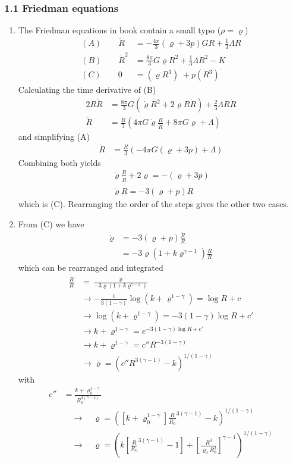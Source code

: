 \documentclass[10pt,a4paper]{book}
\theoremstyle{definition}
\begin{document}
\subsubsection{1.1 Friedman equations}
\begin{enumerate}
\item The Friedman equations in book contain a small typo ($\rho=\varrho$)
\begin{align}
    (A)\qquad \ddot R&=-\frac{4\pi}{3}(\varrho+3p)GR+\frac{1}{3}\Lambda R\\
    (B)\qquad  \dot R^2&=\frac{8\pi}{3}G\varrho R^2+\frac{1}{3}\Lambda R^2-K\\
    (C)\qquad 0&=(\varrho R^3)^\cdot+p(R^3)^\cdot
\end{align}
Calculating the time derivative of (B)
\begin{align}
    2\dot{R}\ddot{R}&=\frac{8\pi}{3}G(\dot{\varrho}R^2+2\varrho R\dot{R})+\frac{2}{3}\Lambda R\dot{R}\\
    \ddot{R}&=\frac{R}{3}\left(4\pi G\dot\varrho \frac{R}{\dot{R}}+8\pi G\varrho +\Lambda\right)
\end{align}
and simplifying (A)
\begin{align}
    \ddot R&=\frac{R}{3}\left(-4\pi G(\varrho+3p)+\Lambda\right)
\end{align}
Combining both yields
\begin{align}
    \dot\varrho \frac{R}{\dot{R}}+2\varrho=-(\varrho+3p)\\
    \dot\varrho R=-3(\varrho+p)\dot{R}
\end{align}
which is (C). Rearranging the order of the steps gives the other two  cases.
\item From (C) we have
\begin{align}
    \dot\varrho &=-3(\varrho+p)\frac{\dot{R}}{R}\\
    &=-3\varrho\left(1+k\varrho^{\gamma-1}\right)\frac{\dot{R}}{R}
\end{align}
which can be rearranged and integrated
\begin{align}
    \frac{\dot{R}}{R}&=\frac{\dot\varrho}{-3\varrho\left(1+k\varrho^{\gamma-1}\right)}\\
    &\rightarrow-\frac{1}{3(1-\gamma)}\log(k+\varrho^{1-\gamma})=\log R+c\\
    &\rightarrow\log(k+\varrho^{1-\gamma})=-3(1-\gamma)\log R+c'\\
    &\rightarrow k+\varrho^{1-\gamma}=e^{-3(1-\gamma)\log R+c'}\\
    &\rightarrow k+\varrho^{1-\gamma}=c''R^{-3(1-\gamma)}\\
    &\rightarrow \varrho=\left(c''R^{3(\gamma-1)}-k\right)^{1/(1-\gamma)}
\end{align}
with
\begin{align}
    c''&=\frac{k+\varrho_0^{1-\gamma}}{R_0^{3(\gamma-1)}}\\
    &\quad\rightarrow\quad\varrho=\left([k+\varrho_0^{1-\gamma}]\frac{R}{R_0}^{3(\gamma-1)}-k\right)^{1/(1-\gamma)}\\
    &\quad\rightarrow\quad\varrho=\left(k\left[\frac{R}{R_0}^{3(\gamma-1)}-1\right]+\left[\frac{R^3}{\varrho_0R_0^3}\right]^{\gamma-1}\right)^{1/(1-\gamma)}
\end{align}


\end{enumerate}
\end{document}
